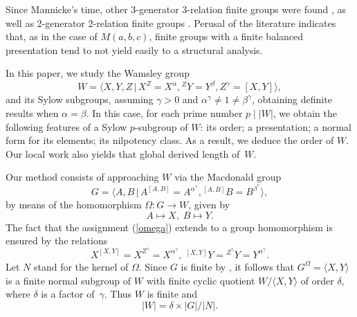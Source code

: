 \documentclass{amsart}
\theoremstyle{definition}
\theoremstyle{remark}
\begin{document}
Since Mannicke's time, other 3-generator 3-relation finite groups were found \cite{W2,W3,P,J,Jam,Jam2, Al},
as well as 2-generator 2-relation finite groups \cite{M, W3, W4, CR, R, CRT, K, AS, AS2}. Perusal
of the literature indicates that, as in the case of $M(a,b,c)$, finite groups with a finite balanced presentation tend to not yield easily to a structural analysis.

In this paper, we study the Wamsley group \cite{W2}
$$
W=\langle X,Y,Z\,|\, X^Z=X^\alpha, {}^Z Y=Y^\beta, Z^\gamma=[X,Y]\rangle,
$$
and its Sylow subgroups, assuming $\gamma>0$ and $\alpha^{\gamma}\neq 1\neq \beta^{\gamma}$, obtaining definite
results when $\alpha=\beta$. In this case, for each prime number $p\mid |W|$, 
we obtain the following features of a Sylow $p$-subgroup of $W$:
its order; a presentation; a normal form for its elements; its nilpotency class. As a result, we deduce the order of $W$.
Our local work also yields that global derived length of~$W$. 

Our method consists of approaching $W$ via the Macdonald group \cite{M}
$$
G=\langle A,B\,|\, A^{[A,B]}=A^{\alpha^\gamma}, {}^{[A,B]} B=B^{\beta^\gamma} \rangle,
$$
by means of the homomorphism $\Omega:G\to W$, given by
\begin{equation}
\label{omega}
A\mapsto X,\; B \mapsto Y.
\end{equation}
The fact that the assignment (\ref{omega}) extends to a group homomorphism is ensured by the relations
$$
X^{[X,Y]}=X^{Z^\gamma}=X^{\alpha^\gamma},\; {}^{[X,Y]} Y={}^{Z^\gamma} Y=Y^{\alpha^\gamma}.
$$
Let $N$ stand for the kernel of $\Omega$. 
Since $G$ is finite by \cite{M}, it follows that $G^\Omega=\langle X,Y\rangle$ is a finite normal subgroup of 
$W$ with finite cyclic quotient $W/\langle X,Y\rangle$ of order $\delta$, where 
$\delta$ is a factor of~$\gamma$. Thus $W$ is finite and 
\begin{equation}
\label{order}
|W|=\delta\times |G|/|N|.
\end{equation}
\end{document}
